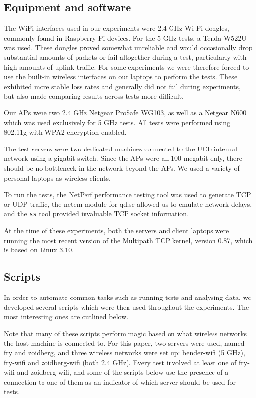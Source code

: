 \subsection{Equipment and software}
\label{sec:met:equip}
The WiFi interfaces used in our experiments were 2.4 GHz Wi-Pi dongles,
commonly found in Raspberry Pi devices. For the 5 GHz tests, a
Tenda W522U was used. These dongles proved somewhat unreliable and would
occasionally drop substantial amounts of packets or fail altogether during a
test, particularly with high amounts of uplink traffic. For some experiments we were therefore forced
to use the built-in wireless interfaces on our laptops to perform the
tests. These exhibited more stable loss rates and generally did not fail
during experiments, but also made comparing results across tests more difficult.

Our APs were two 2.4 GHz Netgear ProSafe WG103, as well as a Netgear N600 which
was used exclusively for 5 GHz tests. All tests were performed using 802.11g with
WPA2 encryption enabled.

The test servers were two dedicated machines connected to the UCL internal
network using a gigabit switch. Since the APs were all 100 megabit only, there
should be no bottleneck in the network beyond the APs. We used a variety of
personal laptops as wireless clients.

To run the tests, the NetPerf performance testing tool was used to generate TCP
or UDP traffic, the netem module for qdisc allowed us to emulate network delays,
and the \texttt{ss} tool provided invaluable TCP socket information.

At the time of these experiments, both the servers and client laptops were
running the most recent version of the Multipath TCP kernel, version 0.87, which
is based on Linux 3.10.

\subsection{Scripts}
\label{sec:met:scripts}
In order to automate common tasks such as running tests and analysing data, we
developed several scripts which were then used throughout the experiments. The
most interesting ones are outlined below.

Note that many of these scripts perform magic based on what wireless networks
the host machine is connected to. For this paper, two servers were used, named fry and
zoidberg, and three wireless networks were set up: bender-wifi (5 GHz), fry-wifi
and zoidberg-wifi (both 2.4 GHz). Every test involved at least one of fry-wifi and
zoidberg-wifi, and some of the scripts below use the presence of a connection to
one of them as an indicator of which server should be used for tests.

